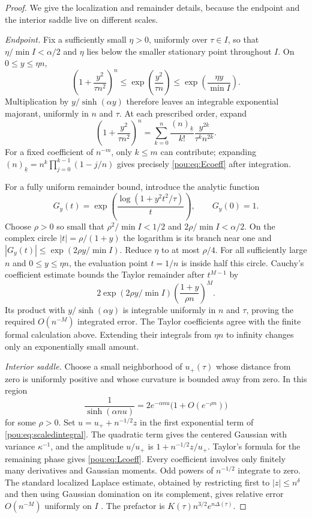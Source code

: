 \documentclass[11pt]{article}
\theoremstyle{definition}
\theoremstyle{remark}
\newcommand{\fall}[2]{(#1)_{\underline{#2}}}
\begin{document}
\begin{proof}
We give the localization and remainder details, because the endpoint
and the interior saddle live on different scales.

\emph{Endpoint.}  Fix a sufficiently small $\eta>0$, uniformly over
$\tau\in I$, so that $\eta/\min I<\alpha/2$ and $\eta$ lies below the
smaller stationary point throughout $I$.
On $0\le y\le\eta n$,
\[
 \left(1+\frac{y^2}{\tau n^2}\right)^n
 \le\exp\left(\frac{y^2}{\tau n}\right)
 \le\exp\left(\frac{\eta y}{\min I}\right).
\]
Multiplication by $y/\sinh(\alpha y)$ therefore leaves an integrable
exponential majorant, uniformly in $n$ and $\tau$.
At each prescribed order, expand
\[
 \left(1+\frac{y^2}{\tau n^2}\right)^n
 =\sum_{k=0}^n\frac{\fall nk}{k!}
                \frac{y^{2k}}{\tau^k n^{2k}}.
\]
For a fixed coefficient of $n^{-m}$, only $k\le m$ can contribute;
expanding $\fall nk=n^k\prod_{j=0}^{k-1}(1-j/n)$ gives precisely
\eqref{pou:eq:Ecoeff} after integration.

For a fully uniform remainder bound, introduce the analytic function
\[
 G_y(t)=\exp\!\left(\frac{\log(1+y^2t^2/\tau)}t\right),\qquad G_y(0)=1.
\]
Choose $\rho>0$ so small that $\rho^2/\min I<1/2$ and
$2\rho/\min I<\alpha/2$.  On the complex circle
$|t|=\rho/(1+y)$ the logarithm is its branch near one and
$|G_y(t)|\le\exp(2\rho y/\min I)$.
Reduce $\eta$ to at most $\rho/4$.  For all sufficiently large $n$ and
$0\le y\le\eta n$, the evaluation point $t=1/n$ is inside half this
circle.  Cauchy's coefficient estimate bounds the Taylor remainder after
$t^{M-1}$ by
\[
 2\exp(2\rho y/\min I)
     \left(\frac{1+y}{\rho n}\right)^M.
\]
Its product with $y/\sinh(\alpha y)$ is integrable uniformly in $n$ and
$\tau$, proving the required $O(n^{-M})$ integrated error.
The Taylor coefficients agree with the finite formal calculation above.
Extending their integrals from $\eta n$ to infinity changes only an
exponentially small amount.

\emph{Interior saddle.}  Choose a small neighborhood of $u_+(\tau)$
whose distance from zero is uniformly positive and whose curvature is
bounded away from zero.  In this region
\[
 \frac1{\sinh(\alpha nu)}
 =2e^{-\alpha nu}\bigl(1+O(e^{-\rho n})\bigr)
\]
for some $\rho>0$.  Set $u=u_++n^{-1/2}z$ in the first exponential term
of \eqref{pou:eq:scaledintegral}.  The quadratic term gives the centered
Gaussian with variance $\kappa^{-1}$, and the amplitude $u/u_+$ is
$1+n^{-1/2}z/u_+$.  Taylor's formula for the remaining phase gives
\eqref{pou:eq:Lcoeff}.  Every coefficient involves only finitely many
derivatives and Gaussian moments.  Odd powers of $n^{-1/2}$ integrate to
zero.  The standard localized Laplace estimate, obtained by restricting
first to $|z|\le n^\delta$ and then using Gaussian domination on its
complement, gives relative error $O(n^{-M})$ uniformly on $I$
\cite{dlmflaplace}.  The prefactor is $K(\tau)n^{3/2}e^{n\Delta(\tau)}$.


\end{proof}
\end{document}
